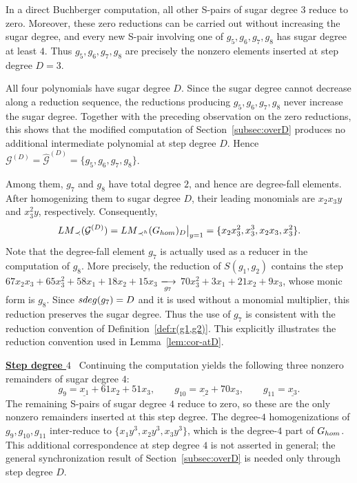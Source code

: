 \documentclass{article}
\theoremstyle{definition}
\theoremstyle{plain}
\theoremstyle{plain}
\theoremstyle{plain}
\theoremstyle{plain}
\numberwithin{equation}{subsection}
\begin{document}
\noindent
In a direct Buchberger computation, all other S-pairs of sugar degree $3$ reduce to zero.
Moreover, these zero reductions can be carried out without increasing the sugar degree, and every new S-pair involving one of $g_5,g_6,g_7,g_8$ has sugar degree at least $4$.
Thus $g_5,g_6,g_7,g_8$ are precisely the nonzero elements inserted at step degree $D=3$.

All four polynomials have sugar degree $D$.
Since the sugar degree cannot decrease along a reduction sequence, the reductions producing $g_5,g_6,g_7,g_8$ never increase the sugar degree.
Together with the preceding observation on the zero reductions, this shows that the modified computation of Section~\ref{subsec:overD} produces no additional intermediate polynomial at step degree $D$.
Hence $\mathcal G^{(D)}=\widehat{\mathcal G}^{(D)}=\{g_5,g_6,g_7,g_8\}$.

Among them, $g_7$ and $g_8$ have total degree $2$, and hence are
degree-fall elements.
After homogenizing them to sugar degree $D$, their leading monomials are $x_2x_3y$ and $x_3^2y$, respectively.
Consequently,
\[
{\rm LM}_{\prec}(\mathcal G^{(D)})
=
{\rm LM}_{\prec^h}(G_{\rm hom})_D\big|_{y=1}
=
\{x_2x_3^2,x_3^3,x_2x_3,x_3^2\}.
\]
Note that the degree-fall element $g_7$ is actually used as a reducer in the computation of $g_8$.
More precisely, the reduction of $S(g_1,g_2)$ contains the step $67x_2x_3+65x_3^2+58x_1+18x_2+15x_3$ $\xlongrightarrow[g_7]{}$ $
70x_3^2+3x_1+21x_2+9x_3$, whose monic form is $g_8$.
Since ${\rm sdeg}(g_7)=D$ and it is used without a monomial multiplier, this reduction preserves the sugar degree.
Thus the use of $g_7$ is consistent with the reduction convention of Definition~\ref{def:r(g1,g2)}.
This explicitly illustrates the reduction convention used in Lemma~\ref{lem:cor-atD}.

\medskip

\noindent \underline{\textbf{Step degree $4$}}~
Continuing the computation yields the following three nonzero remainders of sugar degree $4$:
\[
g_9=\underline{x_1}+61x_2+51x_3,\qquad g_{10}=\underline{x_2}+70x_3,\qquad g_{11}=\underline{x_3}.
\]
The remaining S-pairs of sugar degree $4$ reduce to zero, so these are the only nonzero remainders inserted at this step degree.
The degree-$4$ homogenizations of $g_9,g_{10},g_{11}$ inter-reduce to $\{x_1y^3,x_2y^3,x_3y^3\}$, which is the degree-$4$ part of $G_{\rm hom}$.
This additional correspondence at step degree $4$ is not asserted in general; the general synchronization result of Section~\ref{subsec:overD} is needed only through step degree $D$.
\end{document}

